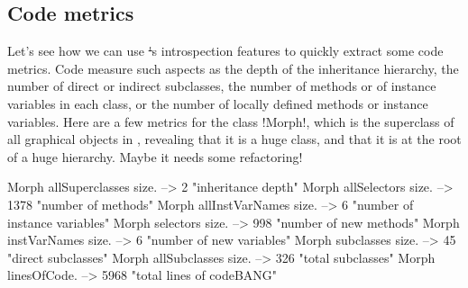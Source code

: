 \documentclass[a4paper,10pt,twoside]{book}
\begin{document}


\subsection{Code metrics}

Let's see how we can use \st's introspection features to quickly extract some code metrics.
Code  measure such aspects as the depth of the inheritance hierarchy, the number of direct or indirect subclasses, the number of methods or of instance variables in each class, or the number of locally defined methods or instance variables.
Here are a few metrics for the class \ct!Morph!, which is the superclass of all graphical objects in \pharo, revealing that it is a huge class, and that it is at the root of a huge hierarchy. Maybe it needs some refactoring! 

\begin{code}{}
Morph allSuperclasses size.  -->       2 "inheritance depth"
Morph allSelectors size.        --> 1378 "number of methods"
Morph allInstVarNames size. -->      6 "number of instance variables"
Morph selectors size.             -->  998 "number of new methods"
Morph instVarNames size.     -->      6 "number of new variables"
Morph subclasses size.          -->    45 "direct subclasses"
Morph allSubclasses size.      -->  326 "total subclasses"
Morph linesOfCode.               --> 5968 "total lines of codeBANG"
\end{code}
\end{document}
